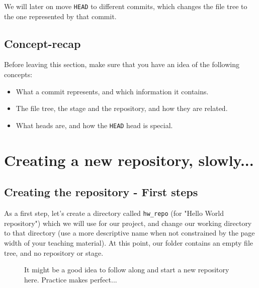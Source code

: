 \documentclass[../main/git_course_main.tex]{subfiles}
\begin{document}
	We will later on move \verb$HEAD$ to different commits, which changes the file tree to the one represented by that commit.
	
	\subsection{Concept-recap}
	
	Before leaving this section, make sure that you have an idea of the following concepts:
	
	\begin{itemize}
		\item What a commit represents, and which information it contains.
		\item The file tree, the stage and the repository, and how they are related.
		\item What heads are, and how the \verb$HEAD$ head is special.
	\end{itemize}
	
	\section{Creating a new repository, slowly...}
	
	
	
	\subsection{Creating the repository - First steps}
	
	As a first step, let's create a directory called \verb$hw_repo$ (for "Hello World repository") which we will use for our project, and change our working directory to that directory (use a more descriptive name when not constrained by the page width of your teaching material). 
	At this point, our folder contains an empty file tree, and no repository or stage.
	
	\begin{figure}[h!]
		\begin{redbox}
			It might be a good idea to follow along and start a new repository here.
			Practice makes perfect...
		\end{redbox}
	\end{figure}
	
\end{document}

